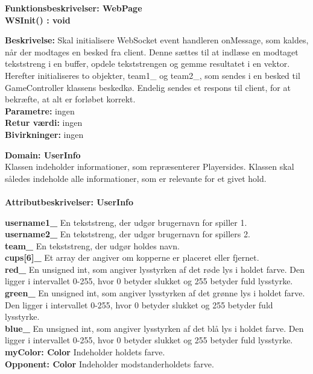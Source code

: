 \documentclass[Arkitektur/System_main.tex]{subfiles}
\begin{document}
{\large\textbf{Funktionsbeskrivelser: WebPage}}\\[0.2cm]
\textbf{WSInit() : void}
\begin{adjustwidth}{1cm}{0pt}
\textbf{Beskrivelse:} Skal initialisere WebSocket event handleren onMessage, som kaldes, når der modtages en besked fra client. Denne sættes til at indlæse en modtaget tekststreng i en buffer, opdele tekststrengen og gemme resultatet i en vektor. Herefter initialiseres to objekter, team1\_ og team2\_, som sendes i en besked til GameController klassens beskedkø. Endelig sendes et respons til client, for at bekræfte, at alt er forløbet korrekt.\\
\textbf{Parametre:} ingen \\[0.2cm]
\textbf{Retur værdi:} ingen \\[0.2cm]
\textbf{Bivirkninger:} ingen \\[0.2cm]
\end{adjustwidth}

{\large\textbf{Domain: UserInfo}}\\
Klassen indeholder informationer, som repræsenterer Playersides. Klassen skal således indeholde alle informationer, som er relevante for et givet hold.\\
\\{\large\textbf{Attributbeskrivelser: UserInfo}}
\begin{adjustwidth}{1cm}{0pt}
\textbf{username1\_} En tekststreng, der udgør brugernavn for spiller 1. \\[0.2cm]
\textbf{username2\_} En tekststreng, der udgør brugernavn for spillers 2. \\[0.2cm]
\textbf{team\_} En tekststreng, der udgør holdes navn. \\[0.2cm]
\textbf{cups[6]\_} Et array der angiver om kopperne er placeret eller fjernet. \\[0.2cm]
\textbf{red\_} En unsigned int, som angiver lysstyrken af det røde lys i holdet farve. Den ligger i intervallet 0-255, hvor 0 betyder slukket og 255 betyder fuld lysstyrke. \\[0.2cm]
\textbf{green\_} En unsigned int, som angiver lysstyrken af det grønne lys i holdet farve. Den ligger i intervallet 0-255, hvor 0 betyder slukket og 255 betyder fuld lysstyrke. \\[0.2cm]
\textbf{blue\_} En unsigned int, som angiver lysstyrken af det blå lys i holdet farve. Den ligger i intervallet 0-255, hvor 0 betyder slukket og 255 betyder fuld lysstyrke. \\[0.2cm]
\textbf{myColor: Color} Indeholder holdets farve.  \\[0.2cm]
\textbf{Opponent: Color} Indeholder modstanderholdets farve.  \\[0.2cm]
\end{adjustwidth}
\end{document}
